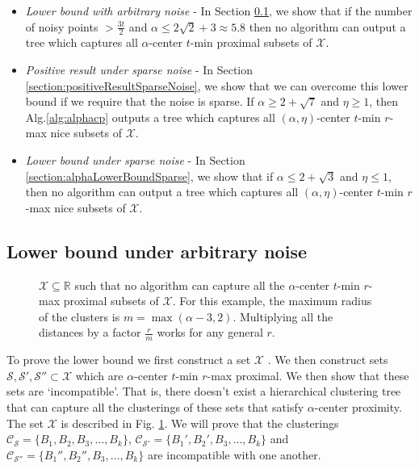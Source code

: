 \documentclass[anon,12pt]{colt2016} %
\newcommand{\mc}{\mathcal}
\begin{document}
\begin{itemize}
\item {\it Lower bound with arbitrary noise} - In Section \ref{section:alphaLowerBoundArbitrary}, we show that if the number of noisy points $> \frac{3t}{2}$ and $\alpha \le 2\sqrt{2} + 3 \approx 5.8$ then no algorithm can output a tree which captures all $\alpha$-center $t$-min proximal subsets of $\mc X$.
\item  {\it Positive result under sparse noise} - In Section \ref{section:positiveResultSparseNoise}, we show that we can overcome this lower bound if we require that the noise is sparse. If $\alpha \ge 2 + \sqrt{7}$ and $\eta \ge 1$, then Alg.\ref{alg:alphacp} outputs a tree which captures all $(\alpha, \eta)$-center $t$-min $r$-max nice subsets of $\mc X$.
\item  {\it Lower bound under sparse noise} - In Section \ref{section:alphaLowerBoundSparse}, we show that if $\alpha \le 2 + \sqrt{3}$ and $\eta \le 1$, then no algorithm can output a tree which captures all $(\alpha, \eta)$-center $t$-min $r$-max nice subsets of $\mc X$.
\end{itemize} 

\subsection{Lower bound under arbitrary noise}
\label{section:alphaLowerBoundArbitrary}

\begin{figure}

\caption{$\mc X \subseteq \mathbb{R}$ such that no algorithm can capture all the $\alpha$-center $t$-min $r$-max proximal subsets of $\mc X$. For this example, the maximum radius of the clusters is $m = \max(\alpha-3, 2)$. Multiplying all the distances by a factor $\frac{r}{m}$ works for any general $r$.} 
\label{fig:nosparsealg}
\end{figure}

To prove the lower bound we first construct a set $\mc X$ . We then construct sets $\mc S, \mc S', \mc S'' \subset \mc X$ which are $\alpha$-center $t$-min $r$-max proximal. We then show that these sets are `incompatible'. That is, there doesn't exist a  hierarchical clustering tree that can capture all the clusterings of these sets that satisfy $\alpha$-center proximity. The set $\mc X$ is described in Fig. \ref{fig:nosparsealg}. We will prove that the clusterings $\mc C_{\mc S} = \{B_1, B_2, B_3, \ldots, B_k\}$, $\mc C_{\mc S'} = \{B_1', B_2', B_3, \ldots, B_k\}$ and $\mc C_{\mc S''} = \{B_1'', B_2'', B_3, \ldots, B_k\}$ are incompatible with one another.
\end{document}
